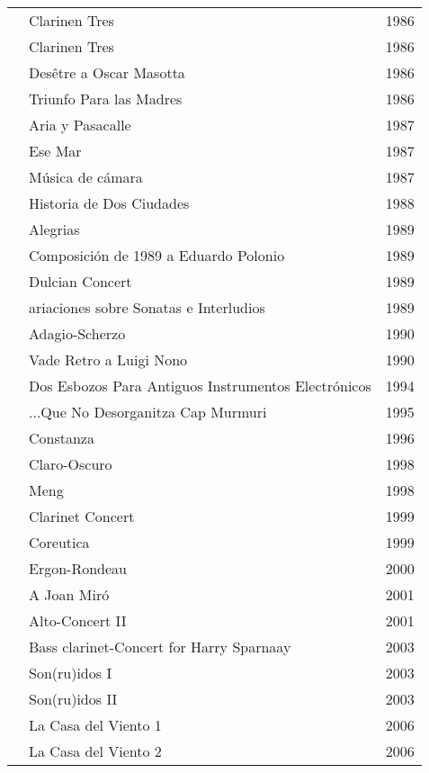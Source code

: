 \begin{center}
\begin{longtable}{ p{}  p{}  p{} }
& Clarinen Tres & 1986 \\ \cmidrule (r){2-3} 
& Clarinen Tres & 1986 \\ \cmidrule (r){2-3} 
& Desêtre a Oscar Masotta & 1986 \\ \cmidrule (r){2-3} 
& Triunfo Para las Madres & 1986 \\ \cmidrule (r){2-3} 
& Aria y Pasacalle & 1987 \\ \cmidrule (r){2-3} 
& Ese Mar & 1987 \\ \cmidrule (r){2-3} 
& Música de cámara & 1987 \\ \cmidrule (r){2-3} 
& Historia de Dos Ciudades & 1988 \\ \cmidrule (r){2-3} 
& Alegrias & 1989 \\ \cmidrule (r){2-3} 
& Composición de 1989 a Eduardo Polonio & 1989 \\ \cmidrule (r){2-3} 
& Dulcian Concert & 1989 \\ \cmidrule (r){2-3} 
& ariaciones sobre Sonatas e Interludios & 1989 \\ \cmidrule (r){2-3} 
& Adagio-Scherzo & 1990 \\ \cmidrule (r){2-3} 
& Vade Retro a Luigi Nono & 1990 \\ \cmidrule (r){2-3} 
& Dos Esbozos Para Antiguos Instrumentos Electrónicos & 1994 \\ \cmidrule (r){2-3} 
& ...Que No Desorganitza Cap Murmuri & 1995 \\ \cmidrule (r){2-3} 
& Constanza & 1996 \\ \cmidrule (r){2-3} 
& Claro-Oscuro & 1998 \\ \cmidrule (r){2-3} 
& Meng & 1998 \\ \cmidrule (r){2-3} 
& Clarinet Concert & 1999 \\ \cmidrule (r){2-3} 
& Coreutica & 1999 \\ \cmidrule (r){2-3} 
& Ergon-Rondeau & 2000 \\ \cmidrule (r){2-3} 
& A Joan Miró & 2001 \\ \cmidrule (r){2-3} 
& Alto-Concert II & 2001 \\ \cmidrule (r){2-3} 
& Bass clarinet-Concert for Harry Sparnaay & 2003 \\ \cmidrule (r){2-3} 
& Son(ru)idos I & 2003 \\ \cmidrule (r){2-3} 
& Son(ru)idos II & 2003 \\ \cmidrule (r){2-3} 
& La Casa del Viento 1 & 2006 \\ \cmidrule (r){2-3} 
& La Casa del Viento 2 & 2006 \\ \midrule 

\end{longtable}
\end{center}
